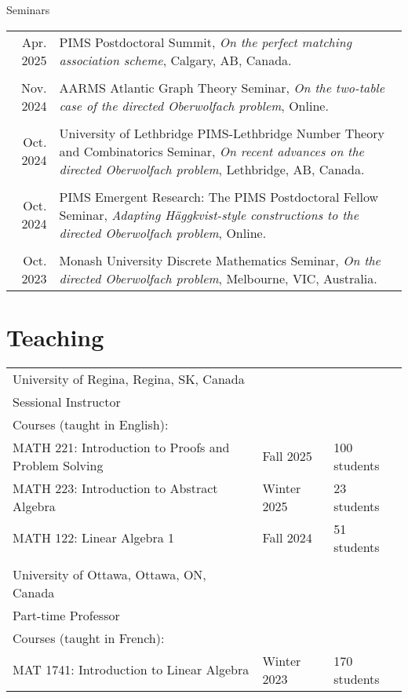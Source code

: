 \documentclass[letter,12pt]{article} %
\begin{document}
 {\raggedleft
 \large Seminars \hfill
 }
 {\raggedleft
 \begin{longtable}{r p{13.5cm}}
Apr. 2025 &PIMS Postdoctoral Summit, \textit{On the perfect matching association scheme}, Calgary, AB, Canada.\\
 &\\[-3mm]
Nov. 2024 & AARMS Atlantic Graph Theory Seminar, \textit{On the two-table case of the directed Oberwolfach problem}, Online.\\
 &\\[-3mm]
Oct. 2024 & University of Lethbridge PIMS-Lethbridge Number Theory and Combinatorics Seminar, \textit{On recent advances on the directed Oberwolfach problem}, Lethbridge, AB, Canada.\\ 
 &\\[-3mm]
Oct. 2024 & PIMS Emergent Research: The PIMS Postdoctoral Fellow Seminar, \textit{Adapting Häggkvist-style constructions to the directed Oberwolfach problem},  Online.\\
&\\[-3mm]
Oct. 2023 & Monash University Discrete Mathematics Seminar, \textit{On the directed Oberwolfach problem}, Melbourne, VIC, Australia. 
 \end{longtable} 
}


\section{Teaching}

\begin{longtable}{l l  l}
 University of Regina, Regina, SK, Canada&&   \\
Sessional Instructor&& \\
 Courses (taught in English):&& \\
MATH 221:  Introduction to Proofs and Problem Solving  &Fall 2025 & 100 students\\
MATH 223:  Introduction to Abstract Algebra  & Winter 2025 & 23 students\\
MATH 122: Linear Algebra 1 & Fall 2024 & 51 students\\
\multicolumn{1}{c}{} &\multicolumn{1}{c}{} \\
University of Ottawa, Ottawa, ON, Canada& &   \\
Part-time Professor&& \\
Courses (taught in French):&&  \\
MAT 1741: Introduction to Linear Algebra&Winter 2023 & 170 students\\
\end{longtable}
\end{document}
